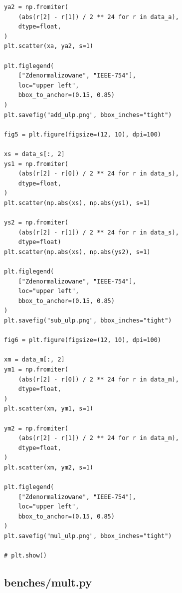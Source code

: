 \documentclass{article}
\begin{document}
\begin{lstlisting}
ya2 = np.fromiter(
    (abs(r[2] - r[1]) / 2 ** 24 for r in data_a),
    dtype=float,
)
plt.scatter(xa, ya2, s=1)

plt.figlegend(
    ["Zdenormalizowane", "IEEE-754"],
    loc="upper left",
    bbox_to_anchor=(0.15, 0.85)
)
plt.savefig("add_ulp.png", bbox_inches="tight")

fig5 = plt.figure(figsize=(12, 10), dpi=100)

xs = data_s[:, 2]
ys1 = np.fromiter(
    (abs(r[2] - r[0]) / 2 ** 24 for r in data_s),
    dtype=float,
)
plt.scatter(np.abs(xs), np.abs(ys1), s=1)

ys2 = np.fromiter(
    (abs(r[2] - r[1]) / 2 ** 24 for r in data_s),
    dtype=float)
plt.scatter(np.abs(xs), np.abs(ys2), s=1)

plt.figlegend(
    ["Zdenormalizowane", "IEEE-754"],
    loc="upper left",
    bbox_to_anchor=(0.15, 0.85)
)
plt.savefig("sub_ulp.png", bbox_inches="tight")

fig6 = plt.figure(figsize=(12, 10), dpi=100)

xm = data_m[:, 2]
ym1 = np.fromiter(
    (abs(r[2] - r[0]) / 2 ** 24 for r in data_m), 
    dtype=float,
)
plt.scatter(xm, ym1, s=1)

ym2 = np.fromiter(
    (abs(r[2] - r[1]) / 2 ** 24 for r in data_m),
    dtype=float,
)
plt.scatter(xm, ym2, s=1)

plt.figlegend(
    ["Zdenormalizowane", "IEEE-754"],
    loc="upper left",
    bbox_to_anchor=(0.15, 0.85)
)
plt.savefig("mul_ulp.png", bbox_inches="tight")

# plt.show()
\end{lstlisting}

\subsection{benches/mult.py}
\end{document}
